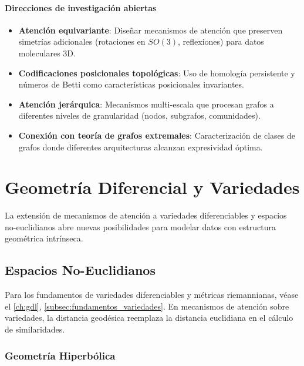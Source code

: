 \paragraph{Direcciones de investigación abiertas}

\begin{itemize}
    \item \textbf{Atención equivariante}: Diseñar mecanismos de atención que preserven simetrías adicionales (rotaciones en $SO(3)$, reflexiones) para datos moleculares 3D.

    \item \textbf{Codificaciones posicionales topológicas}: Uso de homología persistente y números de Betti como características posicionales invariantes.

    \item \textbf{Atención jerárquica}: Mecanismos multi-escala que procesan grafos a diferentes niveles de granularidad (nodos, subgrafos, comunidades).

    \item \textbf{Conexión con teoría de grafos extremales}: Caracterización de clases de grafos donde diferentes arquitecturas alcanzan expresividad óptima.
\end{itemize}

\section{Geometría Diferencial y Variedades}\label{sec:differential_geometry_attention}

La extensión de mecanismos de atención a variedades diferenciables y espacios no-euclidianos abre nuevas posibilidades para modelar datos con estructura geométrica intrínseca.

\subsection{Espacios No-Euclidianos}

Para los fundamentos de variedades diferenciables y métricas riemannianas, véase el \autoref{ch:gdl}, \autoref{subsec:fundamentos_variedades}. En mecanismos de atención sobre variedades, la distancia geodésica reemplaza la distancia euclidiana en el cálculo de similaridades.

\subsubsection{Geometría Hiperbólica}

